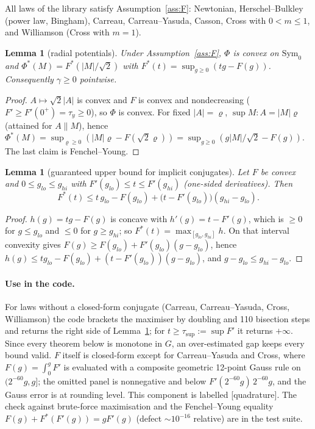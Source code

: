 \documentclass[11pt]{article}
\newtheorem{lemma}[theorem]{Lemma}
\theoremstyle{definition}
\begin{document}
All laws of the library satisfy Assumption~\ref{ass:F}: Newtonian, Herschel--Bulkley (power law, Bingham),
Carreau, Carreau--Yasuda, Casson, Cross with $0<m\le1$, and Williamson (Cross with $m=1$).

\begin{lemma}[radial potentials]\label{lem:radial}
Under Assumption~\ref{ass:F}, $\Phi$ is convex on $\mathrm{Sym}_0$ and $\Phi^*(M)=F^*(|M|/\sqrt2)$ with
$F^*(t)=\sup_{g\ge0}(tg-F(g))$. Consequently $\gamma\ge0$ pointwise.
\end{lemma}
\begin{proof}
$A\mapsto\sqrt2|A|$ is convex and $F$ is convex and nondecreasing ($F'\ge F'(0^+)=\tau_y\ge0$), so $\Phi$ is convex.
For fixed $|A|=\varrho$, $\sup M:A=|M|\varrho$ (attained for $A\parallel M$), hence
$\Phi^*(M)=\sup_{\varrho\ge0}(|M|\varrho-F(\sqrt2\varrho))=\sup_{g\ge0}(g|M|/\sqrt2-F(g))$. The last claim is Fenchel--Young.
\end{proof}

\begin{lemma}[guaranteed upper bound for implicit conjugates]\label{lem:Fstar}
Let $F$ be convex and $0\le g_{lo}\le g_{hi}$ with $F'(g_{lo})\le t\le F'(g_{hi})$ (one-sided derivatives). Then
\[
F^*(t)\le t\,g_{lo}-F(g_{lo})+\big(t-F'(g_{lo})\big)(g_{hi}-g_{lo}).
\]
\end{lemma}
\begin{proof}
$h(g)=tg-F(g)$ is concave with $h'(g)=t-F'(g)$, which is $\ge0$ for $g\le g_{lo}$ and $\le0$ for $g\ge g_{hi}$; so
$F^*(t)=\max_{[g_{lo},g_{hi}]}h$. On that interval convexity gives $F(g)\ge F(g_{lo})+F'(g_{lo})(g-g_{lo})$, hence
$h(g)\le tg_{lo}-F(g_{lo})+(t-F'(g_{lo}))(g-g_{lo})$, and $g-g_{lo}\le g_{hi}-g_{lo}$.
\end{proof}

\paragraph{Use in the code.} For laws without a closed-form conjugate (Carreau, Carreau--Yasuda, Cross, Williamson) the code brackets the
maximiser by doubling and 110 bisection steps and returns the right side of Lemma~\ref{lem:Fstar}; for
$t\ge\tau_{\sup}:=\sup F'$ it returns $+\infty$. Since every theorem below is monotone in $G$, an
over-estimated gap keeps every bound valid. $F$ itself is closed-form except for Carreau--Yasuda and Cross, where
$F(g)=\int_0^gF'$ is evaluated with a composite geometric 12-point Gauss rule on $(2^{-60}g,g]$; the omitted
panel is nonnegative and below $F'(2^{-60}g)\,2^{-60}g$, and the Gauss error is at rounding level. This
component is labelled [quadrature]. The check against brute-force maximisation and the Fenchel--Young equality
$F(g)+F^*(F'(g))=gF'(g)$ (defect $\sim10^{-16}$ relative) are in the test suite.
\end{document}
